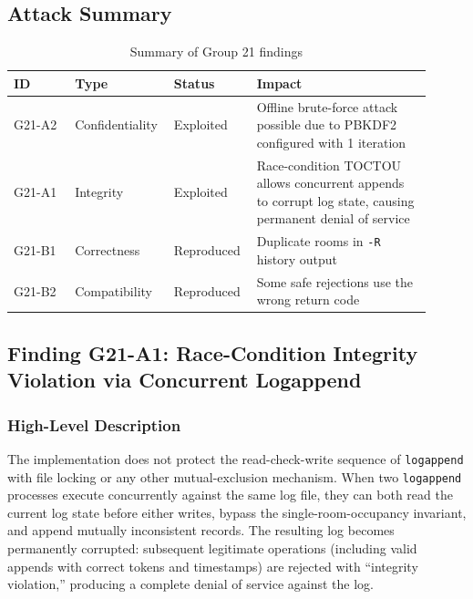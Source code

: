 \documentclass[a4paper, 12pt]{article}
\begin{document}
    \subsection{Attack Summary}
    \begin{table}[H]
        \centering
        \small
        \begin{tabular}{@{}p{0.14\linewidth}p{0.19\linewidth}p{0.18\linewidth}p{0.40\linewidth}@{}}
            \toprule
            \textbf{ID} & \textbf{Type} & \textbf{Status} & \textbf{Impact} \\
            \midrule
            G21-A2 & Confidentiality & Exploited & Offline brute-force attack possible due to PBKDF2 configured with 1 iteration \\G21-A1 & Integrity & Exploited & Race-condition TOCTOU allows concurrent appends to corrupt log state, causing permanent denial of service \\
            G21-B1 & Correctness & Reproduced & Duplicate rooms in \texttt{-R} history output \\
            G21-B2 & Compatibility & Reproduced & Some safe rejections use the wrong return code \\
            \bottomrule
        \end{tabular}
        \caption{Summary of Group 21 findings}
    \end{table}

    \subsection{Finding G21-A1: Race-Condition Integrity Violation via Concurrent Logappend}
    \subsubsection{High-Level Description}
    The implementation does not protect the read-check-write sequence of \texttt{logappend} with file locking or any other mutual-exclusion mechanism. When two \texttt{logappend} processes execute concurrently against the same log file, they can both read the current log state before either writes, bypass the single-room-occupancy invariant, and append mutually inconsistent records. The resulting log becomes permanently corrupted: subsequent legitimate operations (including valid appends with correct tokens and timestamps) are rejected with ``integrity violation,'' producing a complete denial of service against the log.
\end{document}
